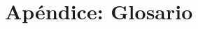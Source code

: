 \documentclass[11pt, a4paper, twoside, titlepage]{article}
\begin{document}
	\newpage
	\appendix
	\section{Apéndice: Glosario} \label{srs:glosario}
	\printglossary 

	\newpage

	\newpage
	\listoffigures

	\newpage
	\nocite{IEEE:1074}
	\nocite{IEEE:830}
	
	
	
	\listoftodos
\end{document}
